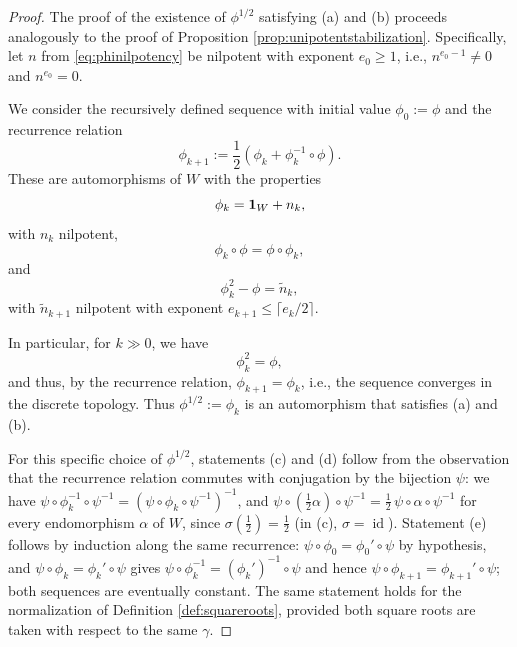 \documentclass[a4paper,12pt,reqno]{amsart}
\DeclareMathOperator{\id}{\mathrm{id}}
\theoremstyle{plain}
\theoremstyle{remark}
\begin{document}
    \begin{proof}
      The proof of the existence of $\phi^{1/2}$ satisfying (a) and (b) proceeds analogously to the proof of Proposition \ref{prop:unipotentstabilization}. Specifically, let $n$ from \eqref{eq:phinilpotency} be nilpotent with exponent $e_0 \ge 1$, i.e., $n^{e_0-1} \neq 0$ and $n^{e_0}=0$.

      We consider the recursively defined sequence with initial value $\phi_0:=\phi$ and the recurrence relation
      \begin{equation}
        \phi_{k+1}:=\frac{1}{2}\left(\phi_k+\phi_{k}^{-1}\circ\phi\right).
      \end{equation}
      These are automorphisms of $W$ with the properties
      \begin{equation}
        \phi_k={\bf1}_{W}+n_k,
      \end{equation}
      with $n_k$ nilpotent,
      \begin{equation}
        \phi_k\circ\phi=\phi\circ\phi_k,
      \end{equation}
      and
      \begin{equation}
        \phi_k^2-\phi = \widetilde{n}_k,
      \end{equation}
      with $\widetilde{n}_{k+1}$ nilpotent with exponent $e_{k+1} \le \lceil e_k/2 \rceil$.

      In particular, for $k \gg 0$, we have
      \[
      \phi_k^2=\phi,
      \]
      and thus, by the recurrence relation, $\phi_{k+1} = \phi_k$, i.e., the sequence converges in the discrete topology. Thus $\phi^{1/2} := \phi_k$ is an automorphism that satisfies (a) and (b).

      For this specific choice of $\phi^{1/2}$, statements (c) and (d) follow from the observation that the recurrence relation commutes with conjugation by the bijection $\psi$: we have $\psi\circ\phi_k^{-1}\circ\psi^{-1}=(\psi\circ\phi_k\circ\psi^{-1})^{-1}$, and $\psi\circ(\frac{1}{2}\alpha)\circ\psi^{-1}=\frac{1}{2}\,\psi\circ\alpha\circ\psi^{-1}$ for every endomorphism $\alpha$ of $W$, since $\sigma(\frac{1}{2})=\frac{1}{2}$ (in (c), $\sigma=\id$). Statement (e) follows by induction along the same recurrence: $\psi\circ\phi_0=\phi_0'\circ\psi$ by hypothesis, and $\psi\circ\phi_k=\phi_k'\circ\psi$ gives $\psi\circ\phi_k^{-1}=(\phi_k')^{-1}\circ\psi$ and hence $\psi\circ\phi_{k+1}=\phi_{k+1}'\circ\psi$; both sequences are eventually constant. The same statement holds for the normalization of Definition \ref{def:squareroots}, provided both square roots are taken with respect to the same $\gamma$.


\end{proof}
\end{document}
